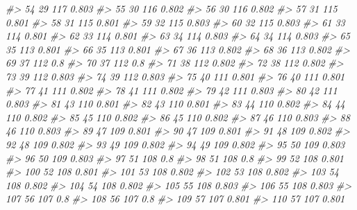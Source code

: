 \documentclass[]{book}
\newenvironment{Shaded}{\begin{snugshade}}{\end{snugshade}}
\newcommand{\CommentTok}[1]{\textcolor[rgb]{0.56,0.35,0.01}{\textit{#1}}}
\begin{document}
\begin{Shaded}
\begin{Highlighting}[]
\CommentTok{#> 54          29      117 0.803}
\CommentTok{#> 55          30      116 0.802}
\CommentTok{#> 56          30      116 0.802}
\CommentTok{#> 57          31      115 0.801}
\CommentTok{#> 58          31      115 0.801}
\CommentTok{#> 59          32      115 0.803}
\CommentTok{#> 60          32      115 0.803}
\CommentTok{#> 61          33      114 0.801}
\CommentTok{#> 62          33      114 0.801}
\CommentTok{#> 63          34      114 0.803}
\CommentTok{#> 64          34      114 0.803}
\CommentTok{#> 65          35      113 0.801}
\CommentTok{#> 66          35      113 0.801}
\CommentTok{#> 67          36      113 0.802}
\CommentTok{#> 68          36      113 0.802}
\CommentTok{#> 69          37      112   0.8}
\CommentTok{#> 70          37      112   0.8}
\CommentTok{#> 71          38      112 0.802}
\CommentTok{#> 72          38      112 0.802}
\CommentTok{#> 73          39      112 0.803}
\CommentTok{#> 74          39      112 0.803}
\CommentTok{#> 75          40      111 0.801}
\CommentTok{#> 76          40      111 0.801}
\CommentTok{#> 77          41      111 0.802}
\CommentTok{#> 78          41      111 0.802}
\CommentTok{#> 79          42      111 0.803}
\CommentTok{#> 80          42      111 0.803}
\CommentTok{#> 81          43      110 0.801}
\CommentTok{#> 82          43      110 0.801}
\CommentTok{#> 83          44      110 0.802}
\CommentTok{#> 84          44      110 0.802}
\CommentTok{#> 85          45      110 0.802}
\CommentTok{#> 86          45      110 0.802}
\CommentTok{#> 87          46      110 0.803}
\CommentTok{#> 88          46      110 0.803}
\CommentTok{#> 89          47      109 0.801}
\CommentTok{#> 90          47      109 0.801}
\CommentTok{#> 91          48      109 0.802}
\CommentTok{#> 92          48      109 0.802}
\CommentTok{#> 93          49      109 0.802}
\CommentTok{#> 94          49      109 0.802}
\CommentTok{#> 95          50      109 0.803}
\CommentTok{#> 96          50      109 0.803}
\CommentTok{#> 97          51      108   0.8}
\CommentTok{#> 98          51      108   0.8}
\CommentTok{#> 99          52      108 0.801}
\CommentTok{#> 100         52      108 0.801}
\CommentTok{#> 101         53      108 0.802}
\CommentTok{#> 102         53      108 0.802}
\CommentTok{#> 103         54      108 0.802}
\CommentTok{#> 104         54      108 0.802}
\CommentTok{#> 105         55      108 0.803}
\CommentTok{#> 106         55      108 0.803}
\CommentTok{#> 107         56      107   0.8}
\CommentTok{#> 108         56      107   0.8}
\CommentTok{#> 109         57      107 0.801}
\CommentTok{#> 110         57      107 0.801}

\end{Highlighting}
\end{Shaded}
\end{document}
